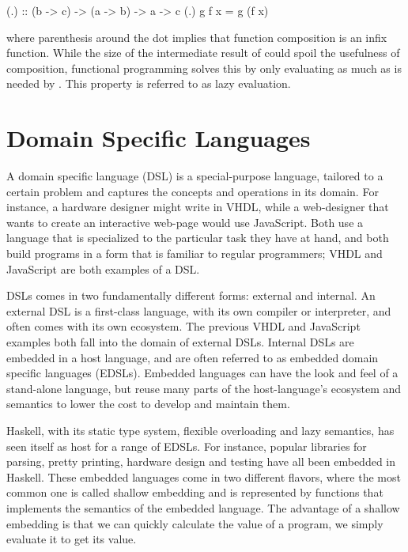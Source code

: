 \documentclass[../main.tex]{subfiles}
\begin{document}
\begin{code}
(.) :: (b -> c) -> (a -> b) -> a -> c
(.) g f x = g (f x)
\end{code}

\noindent where parenthesis around the dot implies that function composition is an infix function. While the size of the intermediate result of  could spoil the usefulness of composition, functional programming solves this by only evaluating  as much as is needed by . This property is referred to as lazy evaluation.

\section{Domain Specific Languages}

A domain specific language (DSL) is a special-purpose language, tailored to a certain problem and captures the concepts and operations in its domain. For instance, a hardware designer might write in VHDL, while a web-designer that wants to create an interactive web-page would use JavaScript. Both use a language that is specialized to the particular task they have at hand, and both build programs in a form that is familiar to regular programmers; VHDL and JavaScript are both examples of a DSL.

DSLs comes in two fundamentally different forms: external and internal. An external DSL is a first-class language, with its own compiler or interpreter, and often comes with its own ecosystem. The previous VHDL and JavaScript examples both fall into the domain of external DSLs. Internal DSLs are embedded in a host language, and are often referred to as embedded domain specific languages (EDSLs). Embedded languages can have the look and feel of a stand-alone language, but reuse many parts of the host-language's ecosystem and semantics to lower the cost to develop and maintain them.

Haskell, with its static type system, flexible overloading and lazy semantics, has seen itself as host for a range of EDSLs. For instance, popular libraries for parsing, pretty printing, hardware design and testing have all been embedded in Haskell. These embedded languages come in two different flavors, where the most common one is called shallow embedding and is represented by functions that implements the semantics of the embedded language. The advantage of a shallow embedding is that we can quickly calculate the value of a program, we simply evaluate it to get its value.
\end{document}
